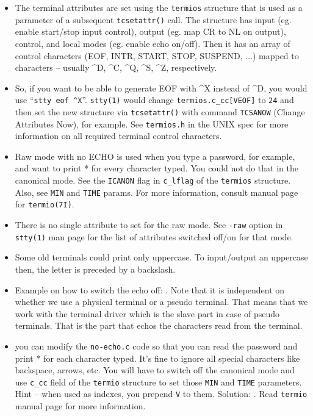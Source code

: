 \begin{itemize}
\item The terminal attributes are set using the \texttt{termios} structure that
is used as a parameter of a subsequent \texttt{tcsetattr()} call. The structure has
input (eg. enable start/stop input control), output (eg. map CR to NL on
output), control, and local modes (eg. enable echo on/off). Then it has an array
of control characters (EOF, INTR, START, STOP, SUSPEND, ...) mapped to
characters  -- usually \^{}D, \^{}C, \^{}Q, \^{}S, \^{}Z, respectively.
\item So, if you want to be able to generate EOF with \^{}X instead of \^{}D,
you would use ``\texttt{stty eof \^{}X}''. \texttt{stty(1)} would change
\texttt{termios.c\_cc[VEOF]} to \texttt{24} and then set the new structure via
\texttt{tcsetattr()} with command \texttt{TCSANOW} (Change Attributes Now), for
example. See \texttt{termios.h} in the UNIX spec for more information on all
required terminal control characters.
\item Raw mode with no ECHO is used when you type a password, for example,
and want to print * for every character typed. You could not do that in the
canonical mode. See the \texttt{ICANON} flag in \texttt{c\_lflag} of the
\texttt{termios} structure. Also, see \texttt{MIN} and \texttt{TIME} params. For
more information, consult manual page for \texttt{termio(7I)}.
\item There is no single attribute to set for the raw mode. See \texttt{-raw}
option in \texttt{stty(1)} man page for the list of attributes switched off/on
for that mode.
\item Some old terminals could print only uppercase. To input/output an
uppercase then, the letter is preceded by a backslash.
\item Example on how to switch the echo off: .
Note that it is independent on whether we use a physical terminal or a pseudo
terminal. That means that we work with the terminal driver which is the slave
part in case of pseudo terminals. That is the part that echos the characters
read from the terminal.
\item {} you can modify the \texttt{no-echo.c} code so that you
can read the password and print * for each character typed. It's fine to ignore
all special characters like backspace, arrows, etc. You will have to switch off
the canonical mode and use \texttt{c\_cc} field of the \texttt{termio} structure
to set those \texttt{MIN} and \texttt{TIME} parameters. Hint -- when used as
indexes, you prepend \texttt{V} to them. Solution:
. Read \texttt{termio} manual page for
more information.
\end{itemize}

